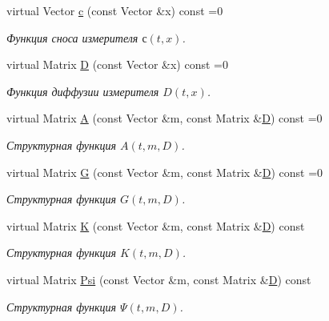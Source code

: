 \begin{DoxyCompactItemize}
virtual Vector \hyperlink{class_core_1_1_continuous_task_a623929970ce6d99f97b83b940003d004}{c} (const Vector \&x) const =0
\begin{DoxyCompactList}\small\item\em Функция сноса измерителя $с(t,x)$. \end{DoxyCompactList}\item 
\hypertarget{class_core_1_1_continuous_task_ac792d0a5d2487a30f9eb360344675173}{}\label{class_core_1_1_continuous_task_ac792d0a5d2487a30f9eb360344675173} 
virtual Matrix \hyperlink{class_core_1_1_continuous_task_ac792d0a5d2487a30f9eb360344675173}{D} (const Vector \&x) const =0
\begin{DoxyCompactList}\small\item\em Функция диффузии измерителя $D(t,x)$. \end{DoxyCompactList}\item 
virtual Matrix \hyperlink{class_core_1_1_continuous_task_a75fbac1abe67223cd7938b724c5cce45}{A} (const Vector \&m, const Matrix \&\hyperlink{class_core_1_1_continuous_task_ac792d0a5d2487a30f9eb360344675173}{D}) const =0
\begin{DoxyCompactList}\small\item\em Структурная функция $A(t, m, D)$. \end{DoxyCompactList}\item 
virtual Matrix \hyperlink{class_core_1_1_continuous_task_a1b579e183ffa229f97048aadfd834517}{G} (const Vector \&m, const Matrix \&\hyperlink{class_core_1_1_continuous_task_ac792d0a5d2487a30f9eb360344675173}{D}) const =0
\begin{DoxyCompactList}\small\item\em Структурная функция $G(t, m, D)$. \end{DoxyCompactList}\item 
virtual Matrix \hyperlink{class_core_1_1_continuous_task_aa6bc3b3c0c973169878c4e4b481dc922}{K} (const Vector \&m, const Matrix \&\hyperlink{class_core_1_1_continuous_task_ac792d0a5d2487a30f9eb360344675173}{D}) const
\begin{DoxyCompactList}\small\item\em Структурная функция $K(t, m, D)$. \end{DoxyCompactList}\item 
virtual Matrix \hyperlink{class_core_1_1_continuous_task_aaf28a2112c6e41e3ac4ff40c95ff71dd}{Psi} (const Vector \&m, const Matrix \&\hyperlink{class_core_1_1_continuous_task_ac792d0a5d2487a30f9eb360344675173}{D}) const
\begin{DoxyCompactList}\small\item\em Структурная функция $\Psi(t, m, D)$. \end{DoxyCompactList}\end{DoxyCompactItemize}
